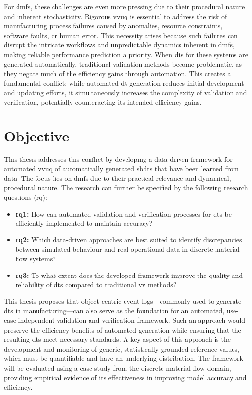 For \gls{dmfs}, these challenges are even more pressing due to their procedural nature and inherent stochasticity. Rigorous \gls{vvuq} is essential to address the risk of manufacturing process failures caused by anomalies, resource constraints, software faults, or human error. This necessity arises because such failures can disrupt the intricate workflows and unpredictable dynamics inherent in \gls{dmfs}, making reliable performance prediction a priority. When \gls{dt}s for these systems are generated automatically, traditional validation methods become problematic, as they negate much of the efficiency gains through automation. This creates a fundamental conflict: while automated \gls{dt} generation reduces initial development and updating efforts, it simultaneously increases the complexity of validation and verification, potentially counteracting its intended efficiency gains.

\section{Objective}

This thesis addresses this conflict by developing a data-driven framework for automated \gls{vvuq} of automatically generated \gls{sbdt}s that have been learned from data. The focus lies on \gls{dmfs} due to their practical relevance and dynamical, procedural nature. The research can further be specified by the following research questions (\gls{rq}):

\begin{itemize}
  \label{par:rq1}
  \item \textbf{\gls{rq}1:} How can automated validation and verification processes for \gls{dt}s be efficiently implemented to maintain accuracy?
        \label{par:rq2}
  \item \textbf{\gls{rq}2:} Which data-driven approaches are best suited to identify discrepancies between simulated behaviour and real operational data in discrete material flow systems?
        \label{par:rq3}
  \item \textbf{\gls{rq}3:} To what extent does the developed framework improve the quality and reliability of \gls{dt}s compared to traditional \gls{vv} methods?
\end{itemize}

This thesis proposes that object-centric event logs—commonly used to generate \gls{dt}s in manufacturing—can also serve as the foundation for an automated, use-case-independent validation and verification framework. Such an approach would preserve the efficiency benefits of automated generation while ensuring that the resulting \gls{dt}s meet necessary standards. A key aspect of this approach is the development and monitoring of generic, statistically grounded reference values, which must be quantifiable and have an underlying distribution. The framework will be evaluated using a case study from the discrete material flow domain, providing empirical evidence of its effectiveness in improving model accuracy and efficiency.

